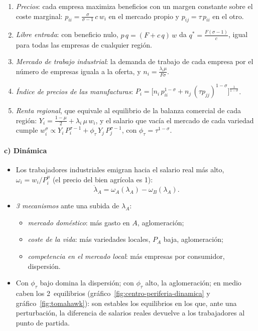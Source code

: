 \documentclass[11pt]{article}
\begin{document}
\begin{enumerate}
\item \emph{Precios}: cada empresa maximiza beneficios con un margen constante sobre el coste marginal: $p_{ii}=\frac{\sigma}{\sigma-1}\,c\,w_i$ en el mercado propio y $p_{ij}=\tau\,p_{ii}$ en el otro.
\item \emph{Libre entrada}: con beneficio nulo, $p\,q=(F+c\,q)\,w$ da $q^*=\frac{F(\sigma-1)}{c}$, igual para todas las empresas de cualquier región.
\item \emph{Mercado de trabajo industrial}: la demanda de trabajo de cada empresa por el número de empresas iguala a la oferta, y $n_i=\frac{\lambda_i\mu}{F\sigma}$.
\item \emph{Índice de precios de las manufacturas}: $P_i=\big[n_i\,p_{ii}^{1-\sigma}+n_j\,(\tau p_{jj})^{1-\sigma}\big]^{\frac{1}{1-\sigma}}$.
\item \emph{Renta regional}, que equivale al equilibrio de la balanza comercial de cada región: $Y_i=\frac{1-\mu}{2}+\lambda_i\,\mu\,w_i$, y el salario que vacía el mercado de cada variedad cumple $w_i^{\sigma}\propto Y_i\,P_i^{\sigma-1}+\phi_\tau\,Y_j\,P_j^{\sigma-1}$, con $\phi_\tau=\tau^{1-\sigma}$.
\end{enumerate}

\paragraph{c) Dinámica}

\begin{itemize}
\item Los trabajadores industriales emigran hacia el salario real más alto, $\omega_i=w_i/P_i^{\mu}$ (el precio del bien agrícola es 1):
  \[
  \dot\lambda_A=\omega_A(\lambda_A)-\omega_B(\lambda_A).
  \]
\item \emph{3 mecanismos} ante una subida de $\lambda_A$:
  \begin{itemize}
  \item \emph{mercado doméstico}: más gasto en $A$, aglomeración;
  \item \emph{coste de la vida}: más variedades locales, $P_A$ baja, aglomeración;
  \item \emph{competencia en el mercado local}: más empresas por consumidor, dispersión.
  \end{itemize}
\item Con $\phi_\tau$ bajo domina la dispersión; con $\phi_\tau$ alto, la aglomeración; en medio caben los 2~equilibrios (gráfico~\ref{fig:centro-periferia-dinamica} y gráfico~\ref{fig:tomahawk}): son estables los equilibrios en los que, ante una perturbación, la diferencia de salarios reales devuelve a los trabajadores al punto de partida.
\end{itemize}
\end{document}
